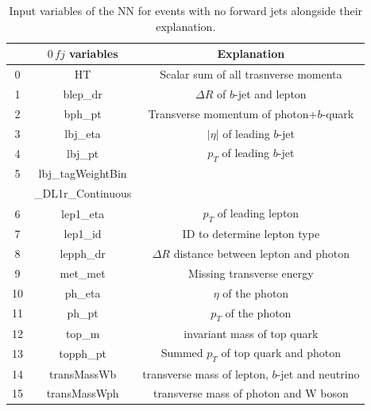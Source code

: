 \begin{table}
    \centering
    \begin{tabular}{c|c|c}
        \toprule
        {} &                     $0\, fj$ variables & Explanation\\
        \midrule
        0  &                                HT &  Scalar sum of all trasnverse momenta\\ \hline
        1  &                           blep\_dr & $\Delta R$ of $b$-jet and lepton\\ \hline
        2  &                            bph\_pt & Transverse momentum of photon+$b$-quark\\ \hline
        3  &                           lbj\_eta & $|\eta|$ of leading $b$-jet\\ \hline
        4  &                            lbj\_pt & $p_T$ of leading $b$-jet\\ \hline
        5 &  lbj\_tagWeightBin&                  \\
        &\_DL1r\_Continuous &\\\hline
        6  &                          lep1\_eta & $p_T$ of leading lepton\\ \hline
        7  &                           lep1\_id & ID to determine lepton type\\ \hline
        8  &                          lepph\_dr & $\Delta R$ distance between lepton and photon\\ \hline
        9  &                           met\_met & Missing transverse energy\\ \hline
        10 &                            ph\_eta & $\eta$ of the photon\\ \hline
        11 &                             ph\_pt & $p_T$ of the photon\\ \hline
        12 &                             top\_m & invariant mass of top quark\\ \hline
        13 &                          topph\_pt & Summed $p_T$ of top quark and photon\\ \hline
        14 &                       transMassWb & transverse mass of lepton, $b$-jet and neutrino\\ \hline
        15 &                      transMassWph & transverse mass of photon and W boson\\ 
        \bottomrule
        \end{tabular}
    \caption{Input variables of the NN for events with no forward jets alongside their explanation.}
    \label{tab:features0}
\end{table}
